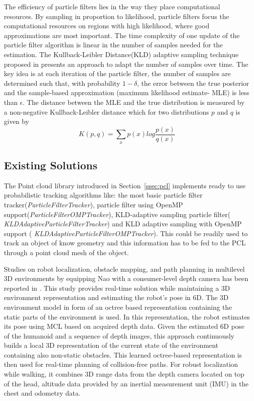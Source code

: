 {	The efficiency of particle filters lies in the way they place computational resources. By sampling in proportion to likelihood, particle filters focus the computational resources on regions with high likelihood, where good approximations are most important. The time complexity of one update of the particle filter algorithm is linear in the number of samples needed for the estimation. The Kullback-Leibler Distance(KLD) adaptive sampling technique proposed in \cite{fox2003adapting} presents an approach to adapt the number of samples over time. The key idea is at each iteration of the particle filter, the number of samples are determined such that, with probability $1-\delta$, the error between the true posterior and the sample-based approximation (maximum likelihood estimate- MLE) is less than $\epsilon$. The distance between the MLE and the true distribution is measured by a non-negative Kullback-Leibler distance which for two distributions $p$ and $q$ is given by
\begin{equation}
K(p,q) = \sum_{x} p(x)log{\frac{p(x)}{q(x)}}
\end{equation}

\subsection{Existing Solutions}
\label{sssec:prob_solutions}
	\par The Point cloud library \cite{RUeda2012} introduced in Section~\ref{ssec:pcl} implements ready to use probabilistic tracking algorithms like: the most basic particle filter tracker(\emph{ParticleFilterTracker}), particle filter using OpenMP support(\emph{ParticleFilterOMPTracker}), KLD-adaptive sampling particle filter( \emph{KLDAdaptiveParticleFilterTracker}) and KLD adaptive sampling with OpenMP support ( \emph{KLDAdaptiveParticleFilterOMPTracker}). This could be readily used to track an object of know geometry and this information has to be fed to the PCL through a point cloud mesh of the object.
	
	Studies on robot localization, obstacle mapping, and path planning in multilevel 3D environments by equipping Nao with a consumer-level depth camera has been reported in \cite{maier2012real}. This study provides real-time solution while maintaining a 3D environment representation and estimating the robot’s pose in 6D. The 3D environment model in form of an octree based representation containing the static parts of the environment is used. In this representation, the robot estimates its pose using MCL based on acquired depth data. Given the estimated 6D pose of the humanoid and a sequence of depth images, this approach continuously builds a local 3D representation of the current state of the environment containing also non-static obstacles. This learned octree-based representation is then used for real-time planning of collision-free paths. For robust localization while walking, it combines 3D range data from the depth camera located on top of the head, altitude data provided by an inertial measurement unit (IMU) in the chest and odometry data.
	
}
